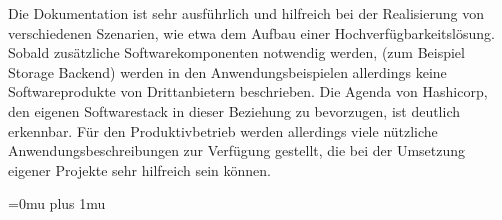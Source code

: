 \documentclass[
book,
a4paper,   
titlepage,  
halfparskip,
12pt        
]{scrartcl}
\begin{document}
\begin{onehalfspacing}
Die Dokumentation ist sehr ausführlich und hilfreich bei der Realisierung von verschiedenen Szenarien, wie etwa dem Aufbau einer Hochverfügbarkeitslösung. Sobald zusätzliche Softwarekomponenten notwendig werden, (zum Beispiel Storage Backend) werden in den Anwendungsbeispielen allerdings keine Softwareprodukte von Drittanbietern beschrieben. Die Agenda von Hashicorp, den eigenen Softwarestack in dieser Beziehung zu bevorzugen, ist deutlich erkennbar. Für den Produktivbetrieb werden allerdings viele nützliche Anwendungsbeschreibungen zur Verfügung gestellt, die bei der Umsetzung eigener Projekte sehr hilfreich sein können.

\newpage
\appendix
\Urlmuskip=0mu plus 1mu




\end{onehalfspacing}
\end{document}
